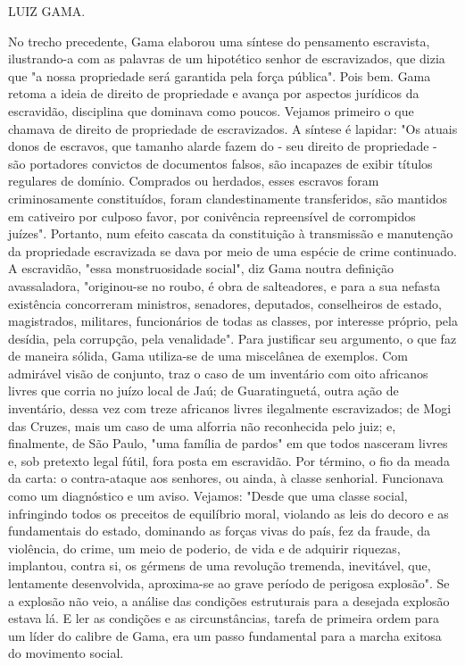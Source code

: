LUIZ GAMA.

\pagebreak
\mbox{}\vfill
\thispagestyle{empty}

{\small\noindent
No trecho precedente, Gama elaborou uma síntese do pensamento
escravista, ilustrando-a com as palavras de um hipotético senhor de
escravizados, que dizia que "a nossa propriedade será garantida pela
força pública". Pois bem. Gama retoma a ideia de direito de propriedade
e avança por aspectos jurídicos da escravidão, disciplina que dominava
como poucos. Vejamos primeiro o que chamava de direito de propriedade de
escravizados. A síntese é lapidar: "Os atuais donos de escravos, que
tamanho alarde fazem do - seu direito de propriedade - são portadores
convictos de documentos falsos, são incapazes de exibir títulos
regulares de domínio. Comprados ou herdados, esses escravos foram
criminosamente constituídos, foram clandestinamente transferidos, são
mantidos em cativeiro por culposo favor, por conivência repreensível de
corrompidos juízes". Portanto, num efeito cascata da constituição à
transmissão e manutenção da propriedade escravizada se dava por meio de
uma espécie de crime continuado. A escravidão, "essa monstruosidade
social", diz Gama noutra definição avassaladora, "originou-se no roubo,
é obra de salteadores, e para a sua nefasta existência concorreram
ministros, senadores, deputados, conselheiros de estado, magistrados,
militares, funcionários de todas as classes, por interesse próprio, pela
desídia, pela corrupção, pela venalidade". Para justificar seu
argumento, o que faz de maneira sólida, Gama utiliza-se de uma
miscelânea de exemplos. Com admirável visão de conjunto, traz o caso de
um inventário com oito africanos livres que corria no juízo local de
Jaú; de Guaratinguetá, outra ação de inventário, dessa vez com treze
africanos livres ilegalmente escravizados; de Mogi das Cruzes, mais um
caso de uma alforria não reconhecida pelo juiz; e, finalmente, de São
Paulo, "uma família de pardos" em que todos nasceram livres e, sob
pretexto legal fútil, fora posta em escravidão. Por término, o fio da
meada da carta: o contra-ataque aos senhores, ou ainda, à classe
senhorial. Funcionava como um diagnóstico e um aviso. Vejamos: "Desde
que uma classe social, infringindo todos os preceitos de equilíbrio
moral, violando as leis do decoro e as fundamentais do estado, dominando
as forças vivas do país, fez da fraude, da violência, do crime, um meio
de poderio, de vida e de adquirir riquezas, implantou, contra si, os
gérmens de uma revolução tremenda, inevitável, que, lentamente
desenvolvida, aproxima-se ao grave período de perigosa explosão". Se a
explosão não veio, a análise das condições estruturais para a desejada
explosão estava lá. E ler as condições e as circunstâncias, tarefa de
primeira ordem para um líder do calibre de Gama, era um passo
fundamental para a marcha exitosa do movimento social.}


